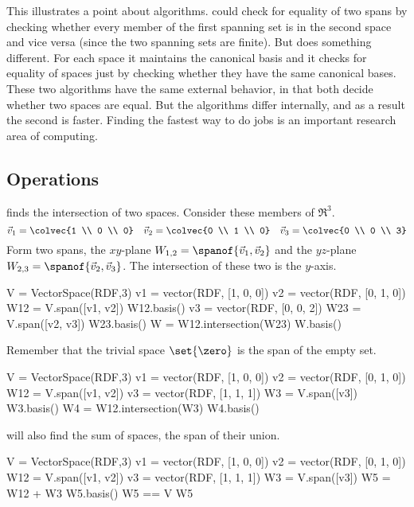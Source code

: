 This illustrates a point about algorithms.
\Sage{} could check for equality of two spans 
by checking whether every member of the first spanning set is in the
second space and vice versa (since the two spanning sets are finite). 
But \Sage{} does something different.
For each space it maintains the canonical basis
and it checks for equality of spaces
just by checking whether they have the same canonical bases.
These two algorithms 
have the same external behavior, in that both decide whether
two spaces are equal.
But the algorithms differ internally, and as a result the second is faster.
Finding the fastest way to do jobs is an important research area of computing.


\subsection{Operations}
\Sage{} finds the intersection of two spaces.
Consider these members of $\Re^3$.
\begin{equation*}
  \vec{v}_1=\colvec{1 \\ 0 \\ 0}
  \quad \vec{v}_2=\colvec{0 \\ 1 \\ 0}
  \quad \vec{v}_3=\colvec{0 \\ 0 \\ 3}
\end{equation*}
Form two spans, the $xy$-plane $W_{1,2}=\spanof{\vec{v}_1, \vec{v}_2}$ 
and the $yz$-plane $W_{2,3}=\spanof{\vec{v}_2, \vec{v}_3}$.
The intersection of these two is the $y$-axis. 
\begin{sageoutput}
V = VectorSpace(RDF,3)
v1 = vector(RDF, [1, 0, 0])
v2 =  vector(RDF, [0, 1, 0])
W12 = V.span([v1, v2])
W12.basis()
v3 = vector(RDF, [0, 0, 2])
W23 = V.span([v2, v3])
W23.basis()
W = W12.intersection(W23)
W.basis()
\end{sageoutput}

Remember that the trivial space $\set{\zero}$ is the span of the empty set.
\begin{sageoutput}[d,0,4]
V = VectorSpace(RDF,3)
v1 = vector(RDF, [1, 0, 0])
v2 =  vector(RDF, [0, 1, 0])
W12 = V.span([v1, v2])
v3 = vector(RDF, [1, 1, 1])
W3 = V.span([v3])
W3.basis()
W4 = W12.intersection(W3)
W4.basis()
\end{sageoutput}

\Sage{} will also find the sum of spaces, the span of their union.
\begin{sageoutput}[d,0,6]
V = VectorSpace(RDF,3)
v1 = vector(RDF, [1, 0, 0])
v2 =  vector(RDF, [0, 1, 0])
W12 = V.span([v1, v2])
v3 = vector(RDF, [1, 1, 1])
W3 = V.span([v3])
W5 = W12 + W3
W5.basis()
W5 == V
W5
\end{sageoutput}






